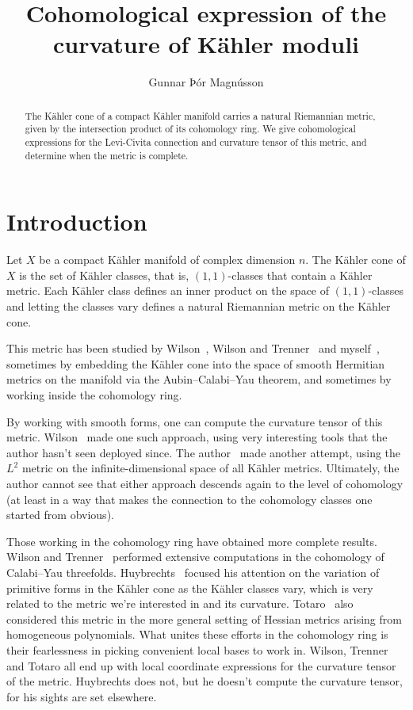 \documentclass[12pt,a4paper]{amsart}
\title{Cohomological expression of the curvature of K\"{a}hler moduli}
\author{Gunnar Þór Magnússon}
\theoremstyle{definition}
\theoremstyle{remark}
\begin{document}
\begin{abstract}
The K\"{a}hler cone of a compact K\"ahler manifold carries a natural Riemannian
metric, given by the intersection product of its cohomology ring. We give
cohomological expressions for the Levi-Civita connection and curvature tensor of
this metric, and determine when the metric is complete.
\end{abstract}

\maketitle



\section*{Introduction}

Let $X$ be a compact K\"{a}hler manifold of complex dimension $n$. The K\"{a}hler
cone of $X$ is the set of K\"{a}hler classes, that is, $(1,1)$-classes that contain
a K\"{a}hler metric. Each K\"{a}hler class defines an inner product on the space of
$(1,1)$-classes and letting the classes vary defines a natural Riemannian metric
on the K\"{a}hler cone. 

This metric has been studied by Wilson~\cite{Wilson}, Wilson and
Trenner~\cite{WilsonTrenner} and myself~\cite{Magnusson}, sometimes by embedding
the K\"{a}hler cone into the space of smooth Hermitian metrics on the manifold via
the Aubin--Calabi--Yau theorem, and sometimes by working inside the cohomology
ring.

By working with smooth forms, one can compute the curvature tensor of this
metric. Wilson~\cite{Wilson} made one such approach, using very interesting
tools that the author hasn't seen deployed since. The author~\cite{Magnusson}
made another attempt, using the $L^2$ metric on the infinite-dimensional space
of all K\"ahler metrics. Ultimately, the author cannot see that either approach
descends again to the level of cohomology (at least in a way that makes the
connection to the cohomology classes one started from obvious).

Those working in the cohomology ring have obtained more complete results.
Wilson and Trenner~\cite{WilsonTrenner} performed extensive computations in the
cohomology of Calabi--Yau threefolds. Huybrechts~\cite{Huybrechts} focused his
attention on the variation of primitive forms in the K\"{a}hler cone as the K\"{a}hler
classes vary, which is very related to the metric we're interested in and its
curvature. Totaro~\cite{totaro} also considered this metric in the more general
setting of Hessian metrics arising from homogeneous polynomials.  What unites
these efforts in the cohomology ring is their fearlessness in picking convenient
local bases to work in. Wilson, Trenner and Totaro all end up with local
coordinate expressions for the curvature tensor of the metric. Huybrechts does
not, but he doesn't compute the curvature tensor, for his sights are set
elsewhere.
\end{document}
